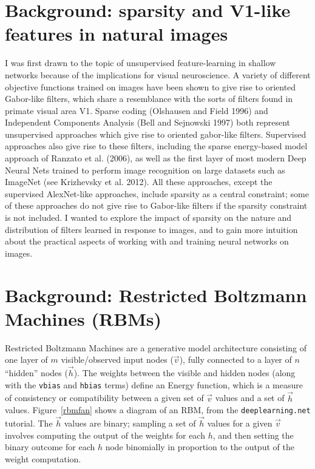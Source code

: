\documentclass[12pt]{article}
\begin{document}
\section*{Background: sparsity and V1-like features in natural images}
I was first drawn to the topic of unsupervised feature-learning in shallow networks because of the implications for visual neuroscience. A variety of different objective functions trained on images have been shown to give rise to oriented Gabor-like filters, which share a resemblance with the sorts of filters found in primate visual area V1. Sparse coding (Olshausen and Field 1996) and Independent Components  Analysis (Bell and Sejnowski 1997) both represent unsupervised approaches which give rise to oriented gabor-like filters. Supervised approaches also give rise to these filters, including the sparse energy-based model approach of Ranzato et al. (2006), as well as the first layer of most modern Deep Neural Nets trained to perform image recognition on large datasets such as ImageNet (see Krizhevsky et al. 2012). All these approaches, except the supervised AlexNet-like approaches, include sparsity as a central constraint; some of these approaches do not give rise to Gabor-like filters if the sparsity constraint is not included. I wanted to explore the impact of sparsity on the nature and distribution of filters learned in response to images, and to gain more intuition about the practical aspects of working with and training neural networks on images.

\section*{Background: Restricted Boltzmann Machines (RBMs)}

Restricted Boltzmann Machines are a generative model architecture consisting of one layer of $m$ visible/observed input nodes ($\vec{v}$), fully connected to a layer of $n$ ``hidden'' nodes ($\vec{h}$). The weights between the visible and hidden nodes (along with the \texttt{vbias} and \texttt{hbias} terms) define an Energy function, which is a measure of consistency or compatibility between a given set of $\vec{v}$ values and a set of $\vec{h}$ values. Figure~\ref{rbmfan} shows a diagram of an RBM, from the \texttt{deeplearning.net} tutorial. The $\vec{h}$ values are binary; sampling a set of $\vec{h}$ values for a given $\vec{v}$ involves computing the output of the weights for each $h$, and then setting the binary outcome for each $h$ node binomially in proportion to the output of the weight computation.
\end{document}
